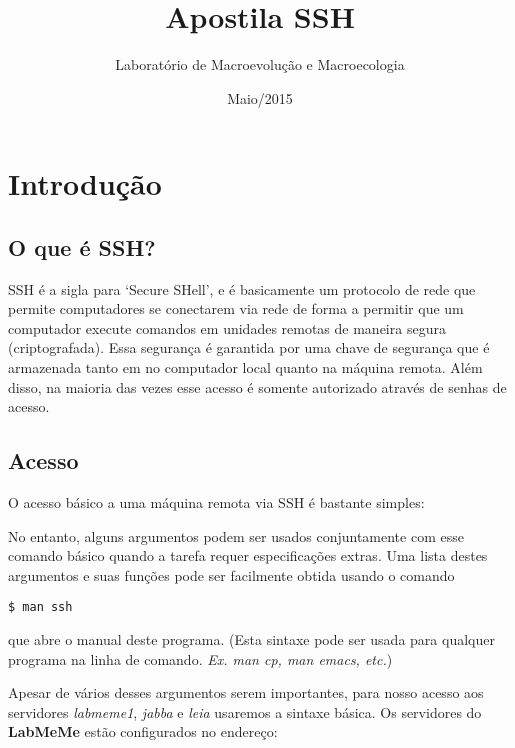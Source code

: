 \documentclass[]{article}
\title{Apostila SSH}
\author{Laboratório de Macroevolução e Macroecologia}
\date{Maio/2015}
\newenvironment{Shaded}{\begin{snugshade}}{\end{snugshade}}
\newcommand{\StringTok}[1]{\textcolor[rgb]{0.31,0.60,0.02}{{#1}}}
\newcommand{\NormalTok}[1]{{#1}}
\begin{document}
\maketitle


{
\hypersetup{linkcolor=black}
\setcounter{tocdepth}{3}
\tableofcontents
}
\section{Introdução}\label{introducao}

\subsection{O que é SSH?}\label{o-que-e-ssh}

SSH é a sigla para `Secure SHell', e é basicamente um protocolo de rede
que permite computadores se conectarem via rede de forma a permitir que
um computador execute comandos em unidades remotas de maneira segura
(criptografada). Essa segurança é garantida por uma chave de segurança
que é armazenada tanto em no computador local quanto na máquina remota.
Além disso, na maioria das vezes esse acesso é somente autorizado
através de senhas de acesso.

\subsection{Acesso}\label{acesso}

O acesso básico a uma máquina remota via SSH é bastante simples:

\begin{Shaded}
\end{Shaded}

No entanto, alguns argumentos podem ser usados conjuntamente com esse
comando básico quando a tarefa requer especificações extras. Uma lista
destes argumentos e suas funções pode ser facilmente obtida usando o
comando

\begin{verbatim}
$ man ssh
\end{verbatim}

que abre o manual deste programa. (Esta sintaxe pode ser usada para
qualquer programa na linha de comando. \emph{Ex. man cp, man emacs,
etc.})

Apesar de vários desses argumentos serem importantes, para nosso acesso
aos servidores \emph{labmeme1}, \emph{jabba} e \emph{leia} usaremos a
sintaxe básica. Os servidores do \textbf{LabMeMe} estão configurados no
endereço:
\end{document}
